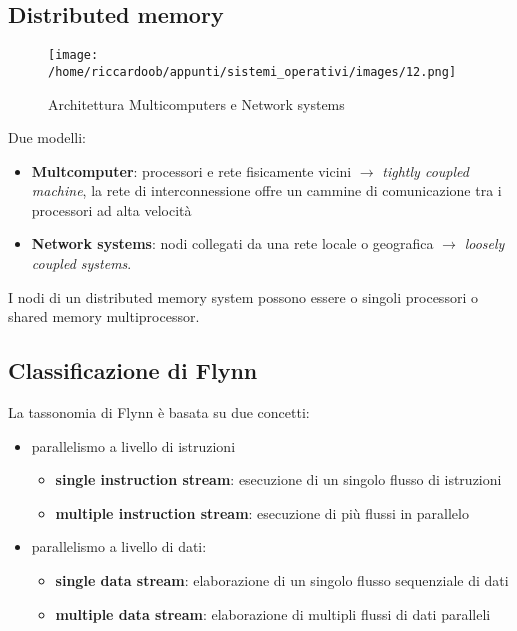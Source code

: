 \subsection{Distributed memory}
\begin{figure}[H]
    \caption{Architettura Multicomputers e Network systems}
    \centering
    \texttt{[image: /home/riccardoob/appunti/sistemi\_operativi/images/12.png]}
\end{figure}

Due modelli:
\begin{itemize}
    \item \textbf{Multcomputer}: processori e rete fisicamente vicini $\rightarrow$ \textit{tightly coupled machine}, la rete di interconnessione offre un cammine di comunicazione tra i processori ad alta velocità
    \item \textbf{Network systems}: nodi collegati da una rete locale o geografica $\rightarrow$ \textit{loosely coupled systems}.
\end{itemize}

I nodi di un distributed memory system possono essere o singoli processori o shared memory multiprocessor.

\subsection{Classificazione di Flynn}

La tassonomia di Flynn è basata su due concetti:
\begin{itemize}
    \item parallelismo a livello di istruzioni
    \begin{itemize}
        \item \textbf{single instruction stream}: esecuzione di un singolo flusso di istruzioni
        \item \textbf{multiple instruction stream}: esecuzione di più flussi in parallelo
    \end{itemize}
    \item parallelismo a livello di dati:
    \begin{itemize}
        \item \textbf{single data stream}: elaborazione di un singolo flusso sequenziale di dati
        \item \textbf{multiple data stream}: elaborazione di multipli flussi di dati paralleli
    \end{itemize}
\end{itemize}

